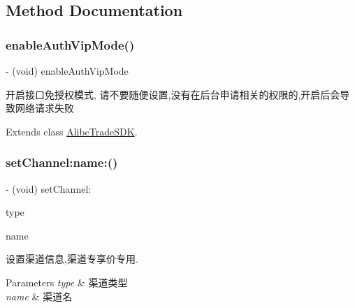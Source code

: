 \subsection{Method Documentation}
\mbox{\label{category_alibc_trade_s_d_k_07_settings_08_a3d359fcee90883874d9f95757ef069c8}} 
\subsubsection{\texorpdfstring{enable\+Auth\+Vip\+Mode()}{enableAuthVipMode()}}
{\footnotesize\ttfamily -\/ (void) enable\+Auth\+Vip\+Mode \begin{DoxyParamCaption}{ }\end{DoxyParamCaption}}

开启接口免授权模式, 请不要随便设置,没有在后台申请相关的权限的,开启后会导致网络请求失败 

Extends class \mbox{\hyperlink{interface_alibc_trade_s_d_k_a3d359fcee90883874d9f95757ef069c8}{Alibc\+Trade\+S\+DK}}.

\mbox{\label{category_alibc_trade_s_d_k_07_settings_08_ab52eb7ebf4462b6f44f3441df9c75e03}} 
\subsubsection{\texorpdfstring{set\+Channel\+:name\+:()}{setChannel:name:()}}
{\footnotesize\ttfamily -\/ (void) set\+Channel\+: \begin{DoxyParamCaption}\item[{(N\+S\+String $\ast$)}]{type }\item[{name:(N\+S\+String $\ast$)}]{name }\end{DoxyParamCaption}}

设置渠道信息,渠道专享价专用.


\begin{DoxyParams}{Parameters}
{\em type} & 渠道类型 \\
\hline
{\em name} & 渠道名 \\
\hline
\end{DoxyParams}


